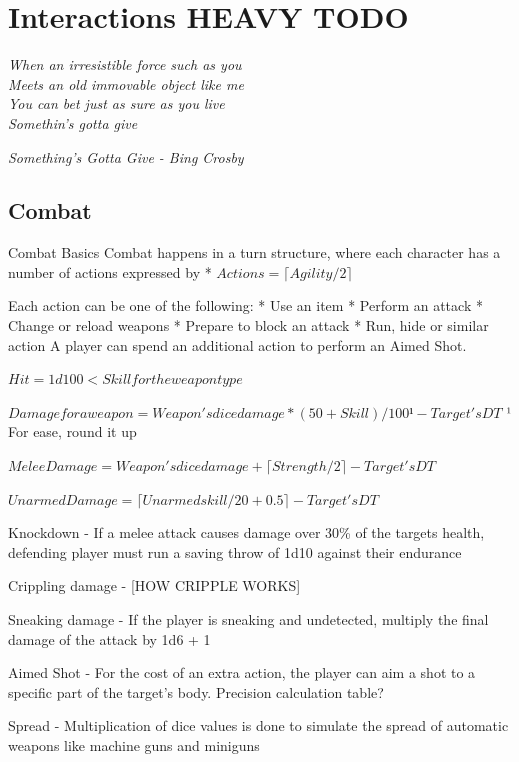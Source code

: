 \documentclass[11pt]{article} %
\begin{document}
\newpage

\section{Interactions HEAVY TODO}

\epigraph{\textit{When an irresistible force such as you \\
Meets an old immovable object like me \\
You can bet just as sure as you live \\
Somethin's gotta give}}{\textit{Something's Gotta Give - Bing Crosby}}

\subsection{Combat}

    Combat Basics
        Combat happens in a turn structure, where each character has a number of actions expressed by
            * $Actions = \lceil Agility / 2 \rceil$

        Each action can be one of the following:
            * Use an item
            * Perform an attack
            * Change or reload weapons
            * Prepare to block an attack
            * Run, hide or similar action
        A player can spend an additional action to perform an Aimed Shot.

        $Hit = 1d100 < Skill for the weapon type$

        $Damage for a weapon = Weapon's dice damage * (50 + Skill) / 100¹ - Target's DT$
        ¹ For ease, round it up
        
        $Melee Damage = Weapon's dice damage + \lceil Strength / 2 \rceil - Target's DT$

        $Unarmed Damage = \lceil Unarmed skill / 20 + 0.5 \rceil - Target's DT$

        Knockdown - If a melee attack causes damage over 30\% of the targets health, defending player must run a saving throw of 1d10 against their endurance

        Crippling damage - [HOW CRIPPLE WORKS]

        Sneaking damage - If the player is sneaking and undetected, multiply the final damage of the attack by 1d6 + 1

        Aimed Shot - For the cost of an extra action, the player can aim a shot to a specific part of the target's body. Precision calculation table?
        
        Spread - Multiplication of dice values is done to simulate the spread of automatic weapons like machine guns and miniguns
        
\end{document}
